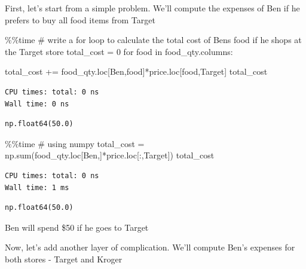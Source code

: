 \documentclass[
  letterpaper,
  DIV=11,
  numbers=noendperiod]{scrreprt}
\newenvironment{Shaded}{\begin{snugshade}}{\end{snugshade}}
\newcommand{\BuiltInTok}[1]{\textcolor[rgb]{0.00,0.23,0.31}{#1}}
\newcommand{\CommentTok}[1]{\textcolor[rgb]{0.37,0.37,0.37}{#1}}
\newcommand{\ControlFlowTok}[1]{\textcolor[rgb]{0.00,0.23,0.31}{#1}}
\newcommand{\DecValTok}[1]{\textcolor[rgb]{0.68,0.00,0.00}{#1}}
\newcommand{\KeywordTok}[1]{\textcolor[rgb]{0.00,0.23,0.31}{#1}}
\newcommand{\NormalTok}[1]{\textcolor[rgb]{0.00,0.23,0.31}{#1}}
\newcommand{\OperatorTok}[1]{\textcolor[rgb]{0.37,0.37,0.37}{#1}}
\newcommand{\StringTok}[1]{\textcolor[rgb]{0.13,0.47,0.30}{#1}}
\begin{document}
First, let's start from a simple problem. We'll compute the expenses of
Ben if he prefers to buy all food items from Target

\begin{Shaded}
\begin{Highlighting}[]
\OperatorTok{\%\%}\NormalTok{time}
\CommentTok{\# write a for loop to calculate the total cost of Ben\textquotesingle{}s food if he shops at the Target store}
\NormalTok{total\_cost }\OperatorTok{=} \DecValTok{0} 
\ControlFlowTok{for}\NormalTok{ food }\KeywordTok{in}\NormalTok{ food\_qty.columns:}

\NormalTok{    total\_cost }\OperatorTok{+=}\NormalTok{ food\_qty.loc[}\StringTok{\textquotesingle{}Ben\textquotesingle{}}\NormalTok{,food]}\OperatorTok{*}\NormalTok{price.loc[food,}\StringTok{\textquotesingle{}Target\textquotesingle{}}\NormalTok{]}
\NormalTok{total\_cost}
\end{Highlighting}
\end{Shaded}

\begin{verbatim}
CPU times: total: 0 ns
Wall time: 0 ns
\end{verbatim}

\begin{verbatim}
np.float64(50.0)
\end{verbatim}

\begin{Shaded}
\begin{Highlighting}[]
\OperatorTok{\%\%}\NormalTok{time}
\CommentTok{\# using numpy }
\NormalTok{total\_cost }\OperatorTok{=}\NormalTok{ np.}\BuiltInTok{sum}\NormalTok{(food\_qty.loc[}\StringTok{\textquotesingle{}Ben\textquotesingle{}}\NormalTok{,]}\OperatorTok{*}\NormalTok{price.loc[:,}\StringTok{\textquotesingle{}Target\textquotesingle{}}\NormalTok{])}
\NormalTok{total\_cost}
\end{Highlighting}
\end{Shaded}

\begin{verbatim}
CPU times: total: 0 ns
Wall time: 1 ms
\end{verbatim}

\begin{verbatim}
np.float64(50.0)
\end{verbatim}

Ben will spend \$50 if he goes to Target

Now, let's add another layer of complication. We'll compute Ben's
expenses for both stores - Target and Kroger
\end{document}
